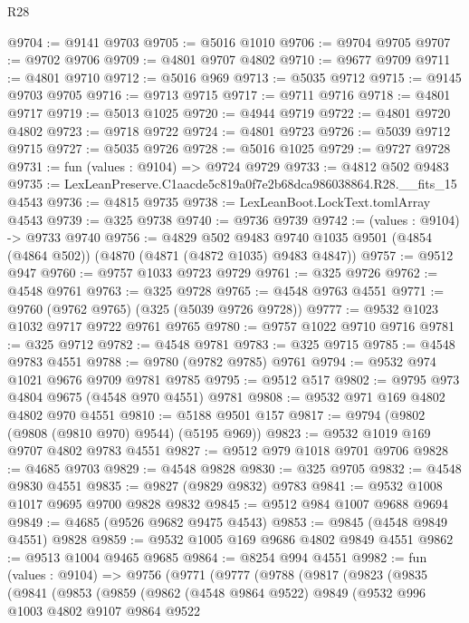 \begin{lexlean}{R28}
\begin{coremodule}
@9704 := @9141 @9703
@9705 := @5016 @1010
@9706 := @9704 @9705
@9707 := @9702 @9706
@9709 := @4801 @9707 @4802
@9710 := @9677 @9709
@9711 := @4801 @9710
@9712 := @5016 @969
@9713 := @5035 @9712
@9715 := @9145 @9703 @9705
@9716 := @9713 @9715
@9717 := @9711 @9716
@9718 := @4801 @9717
@9719 := @5013 @1025
@9720 := @4944 @9719
@9722 := @4801 @9720 @4802
@9723 := @9718 @9722
@9724 := @4801 @9723
@9726 := @5039 @9712 @9715
@9727 := @5035 @9726
@9728 := @5016 @1025
@9729 := @9727 @9728
@9731 := fun (values : @9104) => @9724 @9729
@9733 := @4812 @502 @9483
@9735 := LexLeanPreserve.C1aacde5c819a0f7e2b68dca986038864.R28.__fits_15 @4543
@9736 := @4815 @9735
@9738 := LexLeanBoot.LockText.tomlArray @4543
@9739 := @325 @9738
@9740 := @9736 @9739
@9742 := (values : @9104) -> @9733 @9740
@9756 := @4829
    @502
    @9483
    @9740
    @1035
    @9501
    (@4854 (@4864 @502))
    (@4870 (@4871 (@4872 @1035) @9483 @4847))
@9757 := @9512 @947
@9760 := @9757 @1033 @9723 @9729
@9761 := @325 @9726
@9762 := @4548 @9761
@9763 := @325 @9728
@9765 := @4548 @9763 @4551
@9771 := @9760 (@9762 @9765) (@325 (@5039 @9726 @9728))
@9777 := @9532 @1023 @1032 @9717 @9722 @9761 @9765
@9780 := @9757 @1022 @9710 @9716
@9781 := @325 @9712
@9782 := @4548 @9781
@9783 := @325 @9715
@9785 := @4548 @9783 @4551
@9788 := @9780 (@9782 @9785) @9761
@9794 := @9532 @974 @1021 @9676 @9709 @9781 @9785
@9795 := @9512 @517
@9802 := @9795 @973 @4804 @9675 (@4548 @970 @4551) @9781
@9808 := @9532 @971 @169 @4802 @4802 @970 @4551
@9810 := @5188 @9501 @157
@9817 := @9794 (@9802 (@9808 (@9810 @970) @9544) (@5195 @969))
@9823 := @9532 @1019 @169 @9707 @4802 @9783 @4551
@9827 := @9512 @979 @1018 @9701 @9706
@9828 := @4685 @9703
@9829 := @4548 @9828
@9830 := @325 @9705
@9832 := @4548 @9830 @4551
@9835 := @9827 (@9829 @9832) @9783
@9841 := @9532 @1008 @1017 @9695 @9700 @9828 @9832
@9845 := @9512 @984 @1007 @9688 @9694
@9849 := @4685 (@9526 @9682 @9475 @4543)
@9853 := @9845 (@4548 @9849 @4551) @9828
@9859 := @9532 @1005 @169 @9686 @4802 @9849 @4551
@9862 := @9513 @1004 @9465 @9685
@9864 := @8254 @994 @4551
@9982 := fun (values : @9104) =>
  @9756
    (@9771
      (@9777
        (@9788
          (@9817
            (@9823
              (@9835
                (@9841
                  (@9853
                    (@9859
                      (@9862
                        (@4548 @9864 @9522)
                        @9849
                        (@9532
                          @996
                          @1003
                          @4802
                          @9107
                          @9864
                          @9522

\end{coremodule}
\end{lexlean}
